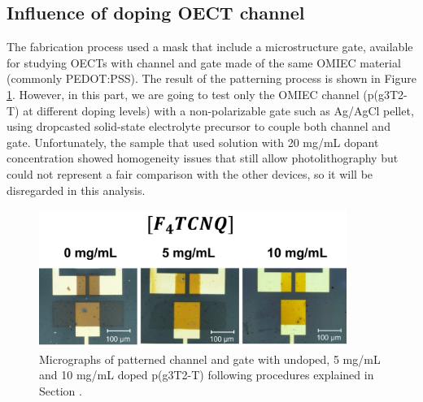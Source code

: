 
\subsection{Influence of doping OECT channel}
The fabrication process used a mask that include a microstructure gate, available for studying OECTs with channel and gate made of the same OMIEC material (commonly PEDOT:PSS). The result of the patterning process is shown in Figure \ref{fig:channel}. However, in this part, we are going to test only the OMIEC channel (p(g3T2-T) at different doping levels) with a non-polarizable gate such as Ag/AgCl pellet, using dropcasted solid-state electrolyte precursor to couple both channel and gate. Unfortunately, the sample that used solution with 20 mg/mL dopant concentration showed homogeneity issues that still allow photolithography but could not represent a fair comparison with the other devices, so it will be disregarded in this analysis.

\begin{figure}[ht]
  \centering
  \includegraphics[width=10cm]{Images/pdf/BigGateDevices.pdf}
  \caption[Micrographs of a patterned channel and gate p(g3T2-T) at different doping levels]{Micrographs of patterned channel and gate with undoped, 5 mg/mL and 10 mg/mL doped p(g3T2-T) following procedures explained in Section \label{subsec:photo}.}
  \label{fig:channel}
\end{figure}


